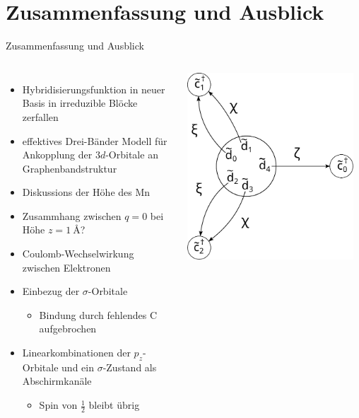 \documentclass[aspectratio=1610, 9pt, xcolor=dvipsnames]{beamer}
\begin{document}
\section{Zusammenfassung und Ausblick}
\begin{frame}{Zusammenfassung und Ausblick}
  \begin{columns}
  \begin{itemize}[<+->]
    \item Hybridisierungsfunktion in neuer Basis in irreduzible Blöcke zerfallen
    \item effektives Drei-Bänder Modell für Ankopplung der $3d$-Orbitale an Graphenbandstruktur
    \item Diskussions der Höhe des Mn
    \vspace*{0.5cm}
    \item Zusammhang zwischen $q=0$ bei Höhe $z=\qty{1}{\angstrom}$?
    \item Coulomb-Wechselwirkung zwischen Elektronen
    \item Einbezug der $\sigma$-Orbitale
    \begin{itemize}
      \item Bindung durch fehlendes C aufgebrochen
    \end{itemize} 
    \item Linearkombinationen der $p_z$-Orbitale und ein $\sigma$-Zustand als Abschirmkanäle
    \begin{itemize}
      \item[\textrightarrow] Spin von $\frac{1}{2}$ bleibt übrig
    \end{itemize}
  \end{itemize}
\centering
\includegraphics[width =0.95\textwidth]{Plots/3band.pdf}
\end{columns}
\end{frame}
\end{document}
